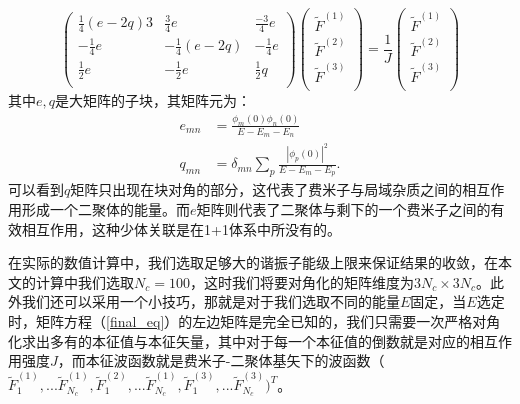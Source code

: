      \begin{equation}
      \left(
        \begin{array}{ccc}
        \frac{1}{4} (e-2 q) 3 & \frac{3}{4} e  & \frac{-3}{4}  e  \\
        -\frac{1}{4}e & -\frac{1}{4} (e-2 q) & -\frac{1}{4} e  \\
        \frac{1}{2} e  & -\frac{1}{2} e  & \frac{1}{2} q  \\
        \end{array}
      \right)
        \left(
            \begin{array}{c}
                \tilde{F}^{(1)} \\
                \tilde{F}^{(2)} \\
                \tilde{F}^{(3)} \\
            \end{array}
        \right)
        =\frac{1}{J}
        \left(
            \begin{array}{c}
                \tilde{F}^{(1)} \\
                \tilde{F}^{(2)} \\
                \tilde{F}^{(3)} \\
            \end{array}
        \right)   \label{final_eq}
    \end{equation}  
其中$e,q$是大矩阵的子块，其矩阵元为：
\begin{equation}
    \begin{split}
      e_{mn} &= \frac{\phi_m(0) \phi_n(0)}{E-E_m-E_n}\\
      q_{mn} &= \delta_{mn}  \sum_p \frac{|\phi_p(0)|^2}{E-E_m-E_p}.   
    \end{split}
\end{equation}
可以看到$q$矩阵只出现在块对角的部分，这代表了费米子与局域杂质之间的相互作用形成一个二聚体的能量。而$e$矩阵则代表了二聚体与剩下的一个费米子之间的有效相互作用，这种少体关联是在1+1体系中所没有的。

在实际的数值计算中，我们选取足够大的谐振子能级上限来保证结果的收敛，在本文的计算中我们选取$N_c=100$，这时我们将要对角化的矩阵维度为$3N_c\times 3N_c$。此外我们还可以采用一个小技巧，那就是对于我们选取不同的能量$E$固定，当$E$选定时，矩阵方程（\ref{final_eq}）的左边矩阵是完全已知的，我们只需要一次严格对角化求出多有的本征值与本征矢量，其中对于每一个本征值的倒数就是对应的相互作用强度$J$，而本征波函数就是费米子-二聚体基矢下的波函数（$\tilde{F}^{(1)}_1,...\tilde{F}^{(1)}_{N_c},\tilde{F}^{(2)}_1,...\tilde{F}^{(1)}_{N_c},\tilde{F}^{(3)}_1,...\tilde{F}^{(3)}_{N_c})^T$。

